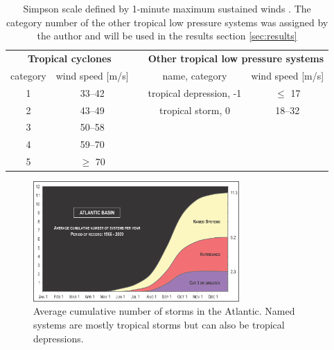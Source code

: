 \begingroup
\setlength{\tabcolsep}{10pt} %
\renewcommand{\arraystretch}{1.5} %
\begin{table}[ht]
	\centering
	\begin{tabular}{|c|c|c|c|c|}
		\cline{1-2} \cline{4-5}
		\multicolumn{2}{|c|}{\textbf{Tropical cyclones}} &                      & \multicolumn{2}{c|}{\textbf{Other tropical low pressure systems}}                                                  \\ \cline{1-2} \cline{4-5}
		category                                         & wind speed {[}m/s{]} &                                                                   & name, category          & wind speed {[}m/s{]} \\ \cline{1-2} \cline{4-5}
		1                                                & 33--42               &                                                                   & tropical depression, -1 & $\leq$ 17            \\
		2                                                & 43--49               &                                                                   & tropical storm, 0       & 18--32               \\
		3                                                & 50--58               &                                                                   &                         &                      \\
		4                                                & 59--70               &                                                                   &                         &                      \\
		5                                                & $\geq$ 70            &                                                                   &                         &                      \\ \cline{1-2} \cline{4-5}
	\end{tabular}
	\caption{Simpson scale defined by 1-minute maximum sustained winds \cite{simpson}. The category number of the other tropical low pressure systems was assigned by the author and will be used in the results section \ref{sec:results}}
	\label{tab:simpson-scale}
\end{table}
\endgroup

\begin{figure}[ht]
	\centering
	\includegraphics[width=0.7\textwidth]{img/cum-average-cat.png}
	\caption{Average cumulative number of storms in the Atlantic. Named systems are mostly tropical storms but can also be tropical depressions.\cite{climatology}}
	\label{fig:cat-climatology}
\end{figure}

